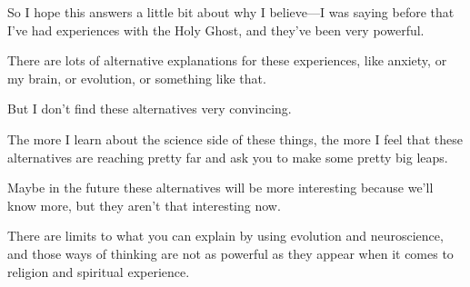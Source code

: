\begin{compactitem}
			\item So I hope this answers a little bit about why I believe---I was saying before that I've had experiences with the Holy Ghost, and they've been very powerful.
				\begin{compactitem}
					\item There are lots of alternative explanations for these experiences, like anxiety, or my brain, or evolution, or something like that.
					\item But I don't find these alternatives very convincing.
					\item The more I learn about the science side of these things, the more I feel that these alternatives are reaching pretty far and ask you to make some pretty big leaps.
					\item Maybe in the future these alternatives will be more interesting because we'll know more, but they aren't that interesting now.
					\item There are limits to what you can explain by using evolution and neuroscience, and those ways of thinking are not as powerful as they appear when it comes to religion and spiritual experience.
				\end{compactitem}
				

\end{compactitem}
